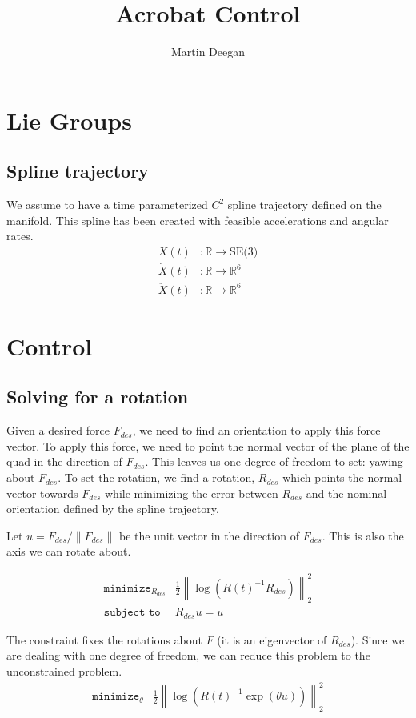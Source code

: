 \documentclass[11pt]{article}
\title{Acrobat Control}
\author{Martin Deegan}
\newcommand{\R}{\mathbb{R}}
\newcommand{\norm}[1]{\left\lVert#1\right\rVert}
\newcommand{\SE}[1]{\text{SE(#1)}}
\begin{document}
 
\maketitle
\tableofcontents

\section{Lie Groups}

\subsection{Spline trajectory}
We assume to have a time parameterized $C^2$ spline trajectory defined on the \SE{3} manifold. This spline has been created with feasible accelerations and angular rates.
\begin{align}
	X(t)&: \R \to \SE{3}\\
	\dot X(t)&: \R \to \R^6\\
	\ddot X(t)&: \R \to \R^6
\end{align}

\section{Control}

\subsection{Solving for a rotation}
Given a desired force $F_{des}$, we need to find an orientation to apply this force vector. To apply this force, we need to point the normal vector of the plane of the quad in the direction of $F_{des}$. This leaves us one degree of freedom to set: yawing about $F_{des}$. To set the rotation, we find a rotation, $R_{des}$ which points the normal vector towards $F_{des}$ while minimizing the error between $R_{des}$ and the nominal orientation defined by the spline trajectory.

Let $u = F_{des} / \norm{F_{des}}$ be the unit vector in the direction of $F_{des}$. This is also the axis we can rotate about.

\begin{align}
	\texttt{minimize}_{R_{des}}& \frac{1}{2}\norm{\log\left(R(t)^{-1}R_{des}\right)}_2^2\\
	\texttt{subject to }& R_{des}u = u
\end{align}

The constraint fixes the rotations about $F$ (it is an eigenvector of $R_{des}$). Since we are dealing with one degree of freedom, we can reduce this problem to the unconstrained problem.
\begin{align}
\texttt{minimize}_\theta& \frac{1}{2}\norm{\log\left(R(t)^{-1}\exp(\theta u)\right)}_2^2
\end{align}
\end{document}
